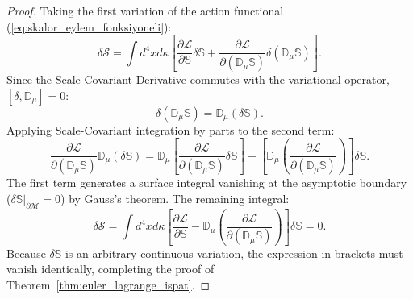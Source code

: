 \begin{proof}
    Taking the first variation of the action functional (\ref{eq:skalor_eylem_fonksiyoneli}):
    \begin{equation}
        \delta \mathcal{S} = \int d^4x d\kappa \left[ \frac{\partial \mathcal{L}}{\partial \mathbb{S}} \delta \mathbb{S} + \frac{\partial \mathcal{L}}{\partial (\mathbb{D}_\mu \mathbb{S})} \delta (\mathbb{D}_\mu \mathbb{S}) \right].
    \end{equation}
    Since the Scale-Covariant Derivative commutes with the variational operator, $[\delta, \mathbb{D}_\mu] = 0$:
    \begin{equation}
        \delta(\mathbb{D}_\mu \mathbb{S}) = \mathbb{D}_\mu (\delta \mathbb{S}).
    \end{equation}
    Applying Scale-Covariant integration by parts to the second term:
    \begin{equation}
        \frac{\partial \mathcal{L}}{\partial (\mathbb{D}_\mu \mathbb{S})} \mathbb{D}_\mu (\delta \mathbb{S}) = \mathbb{D}_\mu \left[ \frac{\partial \mathcal{L}}{\partial (\mathbb{D}_\mu \mathbb{S})} \delta \mathbb{S} \right] - \left[ \mathbb{D}_\mu \left( \frac{\partial \mathcal{L}}{\partial (\mathbb{D}_\mu \mathbb{S})} \right) \right] \delta \mathbb{S}.
    \end{equation}
    The first term generates a surface integral vanishing at the asymptotic boundary ($\delta \mathbb{S}\big|_{\partial \mathcal{M}} = 0$) by Gauss's theorem. The remaining integral:
    \begin{equation}
        \delta \mathcal{S} = \int d^4x d\kappa \left[ \frac{\partial \mathcal{L}}{\partial \mathbb{S}} - \mathbb{D}_\mu \left( \frac{\partial \mathcal{L}}{\partial (\mathbb{D}_\mu \mathbb{S})} \right) \right] \delta \mathbb{S} = 0.
    \end{equation}
    Because $\delta \mathbb{S}$ is an arbitrary continuous variation, the expression in brackets must vanish identically, completing the proof of Theorem~\ref{thm:euler_lagrange_ispat}.
\end{proof}

